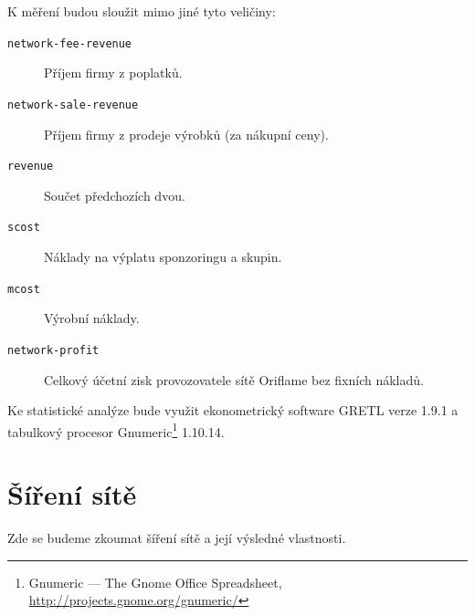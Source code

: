 \documentclass[a4wide,12pt]{report}
\begin{document}
K měření budou sloužit mimo jiné tyto veličiny:
\begin{description}
\item[\texttt{network-fee-revenue}] Příjem firmy z poplatků.
\item[\texttt{network-sale-revenue}] Příjem firmy z prodeje výrobků (za nákupní ceny).
\item[\texttt{revenue}] Součet předchozích dvou.
\item[\texttt{scost}] Náklady na výplatu sponzoringu a skupin.
\item[\texttt{mcost}] Výrobní náklady.
\item[\texttt{network-profit}] Celkový účetní zisk provozovatele sítě Oriflame bez fixních nákladů. 
\end{description}
Ke statistické analýze bude využit ekonometrický software GRETL\cite{gretl} verze 1.9.1 a tabulkový procesor Gnumeric\footnote{Gnumeric --- The Gnome Office Spreadsheet, \url{http://projects.gnome.org/gnumeric/}} 1.10.14.
\section{Šíření sítě}
Zde se budeme zkoumat šíření sítě a její výsledné vlastnosti. 
\end{document}
